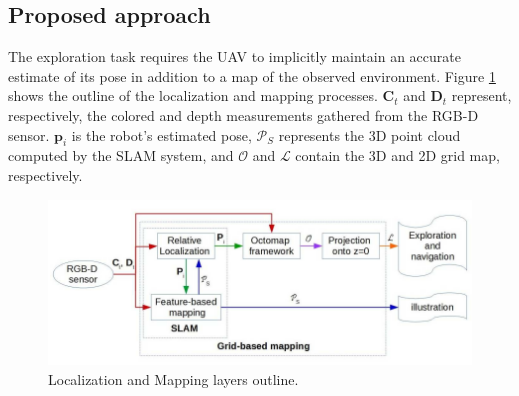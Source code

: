 \subsection{Proposed approach}
The exploration task requires the UAV to implicitly maintain an accurate estimate of its pose in addition to a map of the observed environment. Figure \ref{fig:2.16} shows the outline of the localization and mapping processes. $\mathbf{C}_t$ and $\mathbf{D}_t$ represent, respectively, the colored and depth measurements gathered from the RGB-D sensor. $\mathbf{p}_i$ is the robot’s estimated pose, $\mathcal{P}_S$ represents the 3D point cloud computed by the SLAM system, and $\mathcal{O}$ and $\mathcal{L}$ contain the 3D and 2D grid map, respectively.
\begin{figure}[H]
    \centering
    \includegraphics[scale=0.45]{assets/2_16.png}
    \caption{Localization and Mapping layers outline.}
    \label{fig:2.16}
\end{figure}
